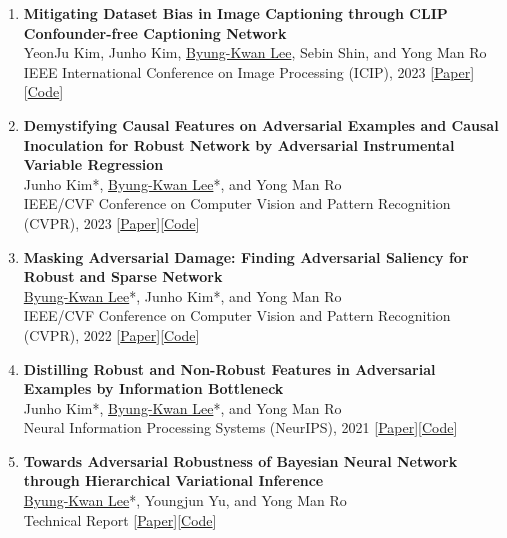 \documentclass[a4paper,11pt]{article}
\begin{document}
{\begin{enumerate}[leftmargin=2.2em, labelsep=0.6em, align=left, itemindent=0em, label={\color{accentDark}\textbf{\arabic*.}}]
\item \textbf{Mitigating Dataset Bias in Image Captioning through CLIP Confounder-free Captioning Network}
\\\vspace{1mm}YeonJu Kim, Junho Kim, \underline{Byung-Kwan Lee}, Sebin Shin, and Yong Man Ro
\\\vspace{2mm}IEEE International Conference on Image Processing (ICIP), 2023 [\href{https://ieeexplore.ieee.org/document/10222502}{Paper}][\href{https://github.com/yeonju7kim/C2Cap}{Code}]

\item \textbf{Demystifying Causal Features on Adversarial Examples and Causal Inoculation for Robust Network by Adversarial Instrumental Variable Regression}
\\\vspace{1mm}Junho Kim*, \underline{Byung-Kwan Lee}*, and Yong Man Ro
\\\vspace{2mm}IEEE/CVF Conference on Computer Vision and Pattern Recognition (CVPR), 2023 [\href{https://arxiv.org/abs/2303.01052}{Paper}][\href{https://github.com/ByungKwanLee/Causal-Adversarial-Instruments}{Code}]

\item \textbf{Masking Adversarial Damage: Finding Adversarial Saliency for Robust and Sparse Network}
\\\vspace{1mm}\underline{Byung-Kwan Lee}*, Junho Kim*, and Yong Man Ro
\\\vspace{2mm}IEEE/CVF Conference on Computer Vision and Pattern Recognition (CVPR), 2022 [\href{https://arxiv.org/abs/2204.02738}{Paper}][\href{https://github.com/ByungKwanLee/Masking-Adversarial-Damage}{Code}]

\item \textbf{Distilling Robust and Non-Robust Features in Adversarial Examples by Information Bottleneck}
\\\vspace{1mm}Junho Kim*, \underline{Byung-Kwan Lee}*, and Yong Man Ro
\\\vspace{2mm}Neural Information Processing Systems (NeurIPS), 2021 [\href{https://arxiv.org/abs/2204.02735}{Paper}][\href{https://github.com/ByungKwanLee/Adversarial-Information-Bottleneck}{Code}]


\item \textbf{Towards Adversarial Robustness of Bayesian Neural Network through Hierarchical Variational Inference}
\\\vspace{1mm}\underline{Byung-Kwan Lee}*, Youngjun Yu, and Yong Man Ro
\\\vspace{2mm}Technical Report [\href{https://openreview.net/forum?id=Cue2ZEBf12}{Paper}][\href{https://github.com/ByungKwanLee/Hierarchical-Bayesian-Defense}{Code}]


\end{enumerate}}
\end{document}
